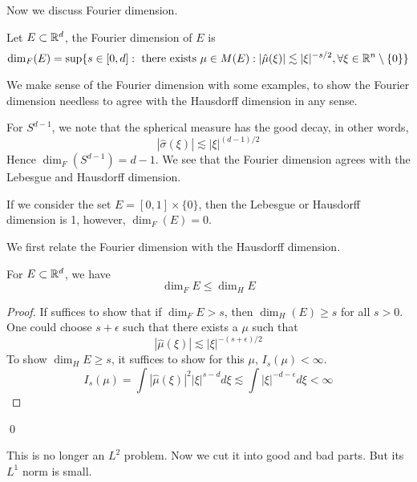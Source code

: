 Now we discuss Fourier dimension.
\begin{definition}
    Let $E\subset\mathbb{R}^d$, the Fourier dimension of $E$ is 
    \begin{equation*}
        \dim_F(E)=\sup\{s\in [0,d]: \text{ there exists }\mu\in M(E): |\hat{\mu}(\xi)|\lesssim |\xi|^{-s/2}, \forall \xi\in\mathbb{R}^n\setminus\{0\}\}
    \end{equation*}
\end{definition}
We make sense of the Fourier dimension with some examples, to show the Fourier dimension needless to agree with the Hausdorff dimension in any sense.
\begin{example}
    For $S^{d-1}$, we note that the spherical measure has the good decay, in other words, 
    \begin{equation*}
        |\hat{\sigma}(\xi)|\lesssim |\xi|^{(d-1)/2}
    \end{equation*}
    Hence $\dim_F(S^{d-1})=d-1$. We see that the Fourier dimension agrees with the Lebesgue and Hausdorff dimension.
\end{example}
\begin{example}
    If we consider the set $E=[0,1]\times\{0\}$, then the Lebesgue or Hausdorff dimension is 1, however, $\dim_F(E)=0$.
\end{example}
We first relate the Fourier dimension with the Hausdorff dimension.
\begin{proposition}
    For $E\subset\mathbb{R}^d$, we have
    \begin{equation*}
        \dim_FE\leq \dim_HE
    \end{equation*}
\end{proposition}
\begin{proof}
    If suffices to show that if $\dim_FE>s$, then $\dim_H(E)\geq s$ for all $s>0$. One could choose $s+\epsilon$ such that there exists a $\mu$ such that 
    \begin{equation*}
        |\hat{\mu}(\xi)|\lesssim |\xi|^{-(s+\epsilon)/2}
    \end{equation*}
    To show $\dim_HE\geq s$, it suffices to show for this $\mu$, $I_s(\mu)<\infty$.
    \begin{equation*}
        I_s(\mu)=\int |\hat{\mu}(\xi)|^2|\xi|^{s-d}d\xi\lesssim \int |\xi|^{-d-\epsilon}d\xi<\infty
    \end{equation*}
\end{proof}
\qed

\begin{note}
    This is no longer an $L^2$ problem. Now we cut it into good and bad parts. But its $L^1$ norm is small.
\end{note}

